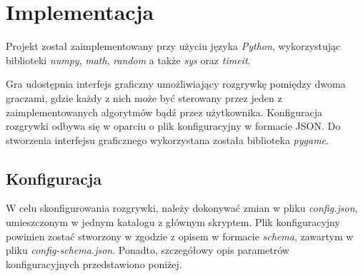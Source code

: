 \documentclass[10pt]{article}
\begin{document}
\section{Implementacja}
Projekt został zaimplementowany przy użyciu języka \textit{Python}, wykorzystując biblioteki \textit{numpy}, \textit{math}, \textit{random} a także \textit{sys} oraz \textit{timeit}.

Gra udostępnia interfejs graficzny umożliwiający rozgrywkę pomiędzy dwoma graczami, gdzie każdy z nich może być sterowany przez jeden z zaimplementowanych algorytmów bądź przez użytkownika. Konfiguracja rozgrywki odbywa się w oparciu o plik konfiguracyjny w formacie JSON. Do stworzenia interfejsu graficznego wykorzystana została biblioteka \textit{pygame}.

\subsection{Konfiguracja}
W celu skonfigurowania rozgrywki, należy dokonywać zmian w pliku \textit{config.json}, umieszczonym w jednym katalogu z głównym skryptem. Plik konfiguracyjny powinien zostać stworzony w zgodzie z opisem w formacie \textit{schema}, zawartym w pliku \textit{config-schema.json}. Ponadto, szczegółowy opis parametrów konfiguracyjnych przedstawiono poniżej.
\end{document}
